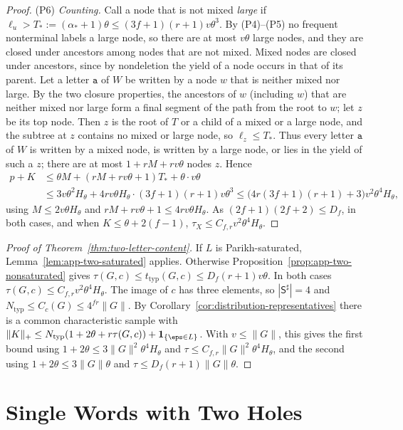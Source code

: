 \begin{proof}
(P6) \emph{Counting.}  Call a node that is not mixed \emph{large} if
$\ell_u>T_*:=(\alpha_*+1)\theta\le(3f+1)(r+1)v\theta^3$.  By (P4)--(P5) no frequent
nonterminal labels a large node, so there are at most $v\theta$ large nodes, and
they are closed under ancestors among nodes that are not mixed.  Mixed nodes are closed under ancestors, since by
nondeletion the yield of a node occurs in that of its parent.  Let a letter
$\mathtt a$ of $W$ be written by a node $w$ that is neither mixed nor large.  By the
two closure properties, the ancestors of $w$ (including $w$) that are neither
mixed nor large form a final segment of the path from the root to $w$; let $z$ be
its top node.  Then $z$ is the root of $T$ or a child of a mixed or a large node,
and the subtree at $z$ contains no mixed or large node, so $\ell_z\le T_*$.  Thus
every letter $\mathtt a$ of $W$ is written by a mixed node, is written by a large
node, or lies in the yield of such a $z$; there are at most $1+rM+rv\theta$ nodes
$z$.  Hence
\[
\begin{aligned}
 p+K&\le\theta M+(rM+rv\theta+1)T_*+\theta\cdot v\theta\\
 &\le3v\theta^2H_\theta+4rv\theta H_\theta\cdot(3f+1)(r+1)v\theta^3
 \le\bigl(4r(3f+1)(r+1)+3\bigr)v^2\theta^4H_\theta,
\end{aligned}
\]
using $M\le2v\theta H_\theta$ and $rM+rv\theta+1\le4rv\theta H_\theta$.  As
$(2f+1)(2f+2)\le D_f$, in both cases, and when
$K\le\theta+2(f-1)$, $\tau_X\le C_{f,r}v^2\theta^4H_\theta$.
\end{proof}

\begin{proof}[Proof of Theorem~\ref{thm:two-letter-content}]
If $L$ is Parikh-saturated, Lemma~\ref{lem:app-two-saturated} applies.  Otherwise
Proposition~\ref{prop:app-two-nonsaturated} gives
$\tau(G,c)\le t_{\mathrm{typ}}(G,c)\le D_f(r+1)v\theta$.  In both cases
$\tau(G,c)\le C_{f,r}v^2\theta^4H_\theta$.  The image of $c$ has three elements, so
$|\mathsf S^\sharp|=4$ and $N_{\mathrm{typ}}\le C_c(G)\le4^{fr}\|G\|$.  By
Corollary~\ref{cor:distribution-representatives} there is a common characteristic
sample with
$\|K\|_+\le N_{\mathrm{typ}}(1+2\theta+r\tau(G,c))+\mathbf 1_{\{\eps\in L\}}$.  With
$v\le\|G\|$, this gives the first bound using $1+2\theta\le3\|G\|^2\theta^4H_\theta$ and
$\tau\le C_{f,r}\|G\|^2\theta^4H_\theta$, and the second using $1+2\theta\le3\|G\|\theta$ and
$\tau\le D_f(r+1)\|G\|\theta$.
\end{proof}

\section{Single Words with Two Holes}
\label{app:singleton}

